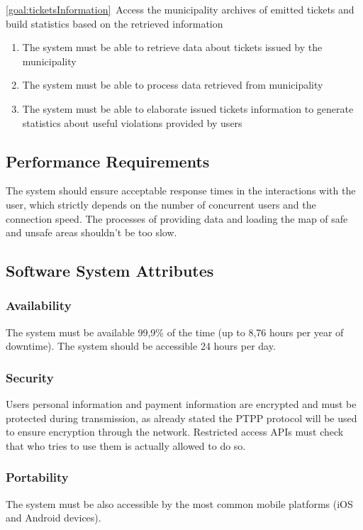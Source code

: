 \begin{description}
  		\item \ref{goal:ticketsInformation}\ Access the municipality archives of emitted tickets and build statistics based on the retrieved information
  			\begin{enumerate}[resume*] 
  				\item The system must be able to retrieve data about tickets issued by the municipality 
   				\item The system must be able to process data retrieved from municipality
   				\item The system must be able to elaborate issued tickets information to generate statistics about useful violations provided by users
   			\end{enumerate}
   	\end{description}
  	
\subsection{Performance Requirements}
	The system should ensure acceptable response times in the interactions with the user, which strictly depends on the number of concurrent users and the connection speed.
\newline
The processes of providing data and loading the map of safe and unsafe areas shouldn't be too slow.
\subsection{Software System Attributes}
	\subsubsection{Availability}
	The system must be available 99,9\% of the time (up to 8,76 hours per year of downtime). The system should be accessible 24 hours per day.
	\subsubsection{Security}
	Users personal information and payment information are encrypted and must be protected during transmission, as already stated the PTPP protocol will be used to ensure encryption through the network.
	Restricted access APIs must check that who tries to use them is actually allowed to do so.
	\subsubsection{Portability}
	The system must be also accessible by the most common mobile platforms (iOS and Android devices).

